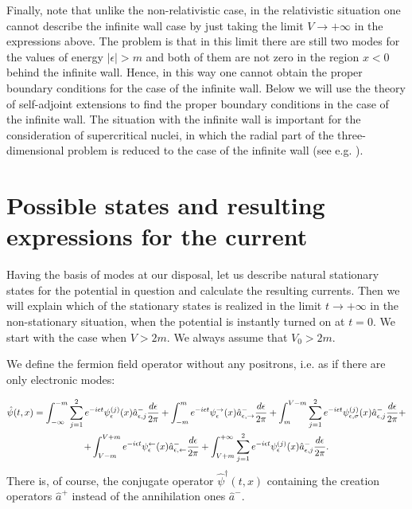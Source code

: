 \documentclass[12pt]{article}
\begin{document}
Finally, note that unlike the non-relativistic case, in the relativistic situation one cannot describe the infinite wall case by just taking the limit $V\rightarrow+\infty$ in the expressions above. The problem is that in this limit there are still two modes for the values of energy $|\epsilon|>m$ and both of them are not zero in the region $x<0$ behind the infinite wall. Hence, in this way one cannot obtain the proper boundary conditions for the case of the infinite wall. Below we will use the theory of self-adjoint extensions to find the proper boundary conditions in the case of the infinite wall. The situation with the infinite wall is important for the consideration of supercritical nuclei, in which the radial part of the three-dimensional problem is reduced to the case of the infinite wall (see e.g. \cite{Gitman2012}).

\section{Possible states and resulting expressions for the current}

Having the basis of modes at our disposal, let us describe natural stationary states for the potential in question and calculate the resulting currents. Then we will explain which of the stationary states is realized in the limit $t\to +\infty$ in the non-stationary situation, when the potential is instantly turned on at $t=0$. We start with the case when $V>2m$. We always assume that $V_0 > 2m$.

We define the fermion field operator without any positrons, i.e. as if there are only electronic modes: 

\begin{gather}
	\hat{\psi}(t,x)=\textcolor{black}{\int^{-m}_{-\infty}\sum^2_{j=1}e^{-i\epsilon t}\psi^{(j)}_{\epsilon}(x)\hat{a}^{-}_{\epsilon,j}\frac{d\epsilon}{2\pi}}+\int^{m}_{-m}e^{-i\epsilon t}\psi^{\rightarrow}_{\epsilon}(x)\hat{a}^{-}_{\epsilon,\rightarrow}\frac{d\epsilon}{2\pi}+\int^{V-m}_{m}\sum^2_{j=1}e^{-i\epsilon t}\psi^{(j)}_{\epsilon,\sigma}(x)\hat{a}^{-}_{\epsilon,j}\frac{d\epsilon}{2\pi}+ \nonumber \\
	+\int^{V+m}_{V-m}e^{-i\epsilon t}\psi^{\leftarrow}_{\epsilon}(x)\hat{a}^{-}_{\epsilon,\leftarrow}\frac{d\epsilon}{2\pi}+\int_{V+m}^{+\infty}\sum^2_{j=1}e^{-i\epsilon t}\psi^{(j)}_{\epsilon}(x)\hat{a}^{-}_{\epsilon,j}\frac{d\epsilon}{2\pi}.
\end{gather}
There is, of course, the conjugate operator $\hat{\psi}^{\dagger}(t,x)$ containing the creation operators $\hat{a}^+$ instead of the annihilation ones $\hat{a}^-$.
\end{document}
